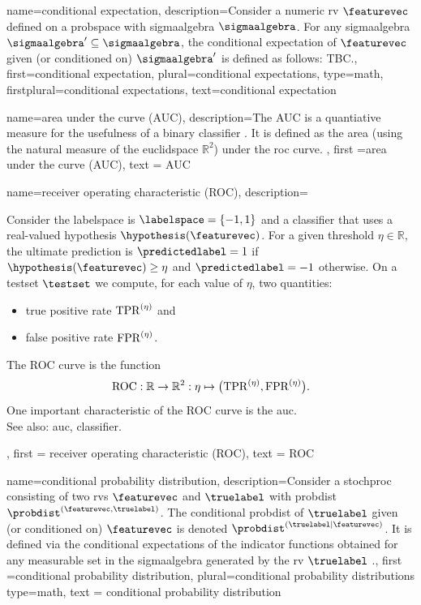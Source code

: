 {name={conditional expectation}, 
 description={Consider a numeric \gls{rv} $\featurevec$ defined on a \gls{probspace} with 
   \gls{sigmaalgebra} $\sigmaalgebra$. For any \gls{sigmaalgebra} $\sigmaalgebra' \subseteq 
   \sigmaalgebra$, the conditional expectation of $\featurevec$ given 
   (or conditioned on) $\sigmaalgebra'$ is defined as follows: TBC.}, 
 first={conditional expectation},
 plural={conditional expectations}, 
 type=math, 
 firstplural={conditional expectations},  
 text={conditional expectation}
}

{name={area under the curve (AUC)}, 
 description={The AUC is a quantiative measure for the 
 			  usefulness of a binary \gls{classifier} \cite{Hanley:1982aa}. It 
			  is defined as the area (using the natural measure of the \gls{euclidspace} $\mathbb{R}^{2}$) 
			  under the \gls{roc} curve.} , 
 first ={area under the curve (AUC)}, 
 text = {AUC} 
}

{name={receiver operating characteristic (ROC)}, 
description={Consider the \gls{labelspace} is $\labelspace=\{-1,1\}$ and a \gls{classifier} 
 			  that uses a real-valued \gls{hypothesis} $\hypothesis(\featurevec)$. For a given 
 			  threshold $\eta \in \mathbb{R}$, the ultimate \gls{prediction} is $\predictedlabel=1$ 
 			  if $\hypothesis(\featurevec)\geq \eta$ and $\predictedlabel=-1$ otherwise. 
 			  On a \gls{testset} $\testset$ we compute, for each value of $\eta$, two quantities: 
 			  \begin{itemize} 
 				\item true positive rate ${\rm TPR}^{(\eta)}$ and 
 				\item false positive rate ${\rm FPR}^{(\eta)}$. 
 			  \end{itemize}  
 			  The ROC curve is  
 			  the \gls{function} \cite{IntroROCFawcett}
 			  $${\rm ROC}: \mathbb{R} \rightarrow \mathbb{R}^{2}: \eta \mapsto \big({\rm TPR}^{(\eta)}, {\rm FPR}^{(\eta)} \big).$$ 
 	          One important characteristic of the ROC curve is the \gls{auc}.\\ 
 			  See also: \gls{auc}, \gls{classifier}.}, 
  first = {receiver operating characteristic (ROC)}, 
  text = {ROC}
 }

{name={conditional probability distribution}, 
  description={Consider 
     a \gls{stochproc} consisting of two \glspl{rv} $\featurevec$ and $\truelabel$ 
    with \gls{probdist} $\probdist^{(\featurevec,\truelabel)}$. The conditional 
    \gls{probdist} of $\truelabel$ given (or conditioned on) $\featurevec$ is 
    denoted $\probdist^{(\truelabel|\featurevec)}$. It is defined via the 
    conditional \glspl{expectation} of the indicator functions obtained 
    for any \gls{measurable} set in the \gls{sigmaalgebra} generated by 
    the \gls{rv} $\truelabel$ \cite{BillingsleyProbMeasure,KallenbergBook}.},
  first ={conditional probability distribution}, 
  plural={conditional probability distributions}
  type=math, 
  text = {conditional probability distribution}
}

